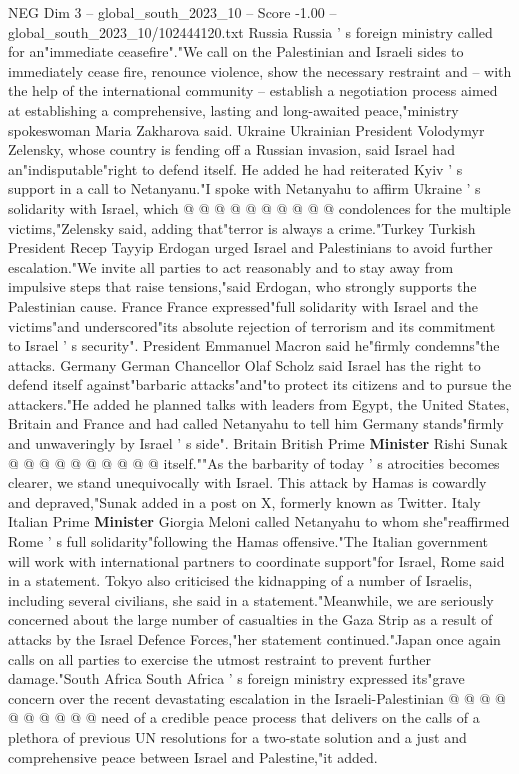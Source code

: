 \begin{textsample}{NEG Dim 3 – global\_south\_2023\_10 – Score -1.00 – global\_south\_2023\_10/102444120.txt}
Russia Russia ' s foreign ministry called for an"immediate ceasefire"."We call on the Palestinian and Israeli sides to immediately cease fire, renounce violence, show the necessary restraint and -- with the help of the international community -- establish a negotiation process aimed at establishing a comprehensive, lasting and long-awaited peace,"ministry spokeswoman Maria Zakharova said.
Ukraine Ukrainian President Volodymyr Zelensky, whose country is fending off a Russian invasion, said Israel had an"indisputable"right to defend itself.
He added he had reiterated Kyiv ' s support in a call to Netanyanu."I spoke with Netanyahu to affirm Ukraine ' s solidarity with Israel, which @ @ @ @ @ @ @ @ @ @ condolences for the multiple victims,"Zelensky said, adding that"terror is always a crime."Turkey Turkish President Recep Tayyip Erdogan urged Israel and Palestinians to avoid further escalation."We invite all parties to act reasonably and to stay away from impulsive steps that raise tensions,"said Erdogan, who strongly supports the Palestinian cause.
France France expressed"full solidarity with Israel and the victims"and underscored"its absolute rejection of terrorism and its commitment to Israel ' s security".
President Emmanuel Macron said he"firmly condemns"the attacks.
Germany German Chancellor Olaf Scholz said Israel has the right to defend itself against"barbaric attacks"and"to protect its citizens and to pursue the attackers."He added he planned talks with leaders from Egypt, the United States, Britain and France and had called Netanyahu to tell him Germany stands"firmly and unwaveringly by Israel ' s side".
Britain British Prime \textbf{Minister} Rishi Sunak @ @ @ @ @ @ @ @ @ @ itself.""As the barbarity of today ' s atrocities becomes clearer, we stand unequivocally with Israel.
This attack by Hamas is cowardly and depraved,"Sunak added in a post on X, formerly known as Twitter.
Italy Italian Prime \textbf{Minister} Giorgia Meloni called Netanyahu to whom she"reaffirmed Rome ' s full solidarity"following the Hamas offensive."The Italian government will work with international partners to coordinate support"for Israel, Rome said in a statement.
Tokyo also criticised the kidnapping of a number of Israelis, including several civilians, she said in a statement."Meanwhile, we are seriously concerned about the large number of casualties in the Gaza Strip as a result of attacks by the Israel Defence Forces,"her statement continued."Japan once again calls on all parties to exercise the utmost restraint to prevent further damage."South Africa South Africa ' s foreign ministry expressed its"grave concern over the recent devastating escalation in the Israeli-Palestinian @ @ @ @ @ @ @ @ @ @ need of a credible peace process that delivers on the calls of a plethora of previous UN resolutions for a two-state solution and a just and comprehensive peace between Israel and Palestine,"it added.

\end{textsample}

